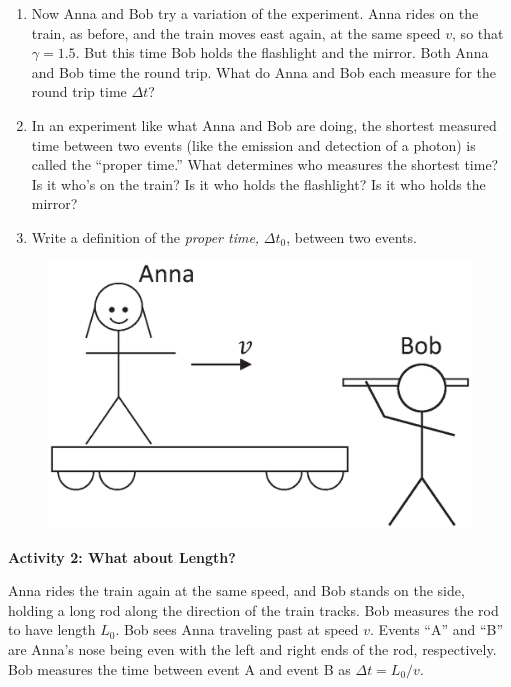 \begin{enumerate}
\item Now Anna and Bob try a variation of the experiment.  Anna rides on the train, as before, and the train moves east again, at the same speed $v$, so that $\gamma=1.5$.  But this time Bob holds the flashlight and the mirror.  Both Anna and Bob time the round trip.  What do Anna and Bob each measure for the round trip time $\Delta t$?
\answerspace{0.5in}

\item In an experiment like what Anna and Bob are doing, the shortest measured time between two events (like the emission and detection of a photon) is called the ``proper time.''  What determines who measures the shortest time? Is it who's on the train?  Is it who holds the flashlight?  Is it who holds the mirror?
\answerspace{0.5in}

\item Write a definition of the \textit{proper time,} $\Delta t_0$, between two events.
\answerspace{0.5in}
\end{enumerate}

\begin{figure}
\begin{center}
\vspace{-0.4in}
\includegraphics[scale=0.4]{time_dilation_length_contraction/anna_and_bob2.eps}
\end{center}
\end{figure}

\textbf{Activity 2: What about Length?}

Anna rides the train again at the same speed, and Bob stands on the side, holding a long rod along the direction of the train tracks.  Bob measures the rod to have length $L_0$.  Bob sees Anna traveling past at speed $v$.  Events ``A'' and ``B'' are Anna's nose being even with the left and right ends of the rod, respectively.  Bob measures the time between event A and event B as $\Delta t=L_0 / v$.  

